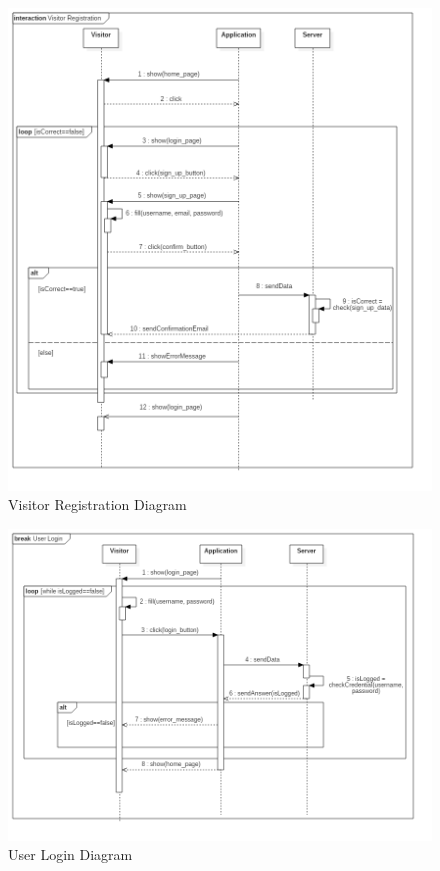\begin{figure}[!h]
\centering
\includegraphics[scale=0.6]{images/VisitorRegistrationDiagram}
\caption{Visitor Registration Diagram}
\label{ref:visitorregistrationdiagram}
\end{figure}

\clearpage
\begin{figure}[!h]
\centering
\includegraphics[scale=0.5]{images/UserLoginDiagram}
\caption{User Login Diagram}
\label{ref:userlogindiagram}
\end{figure}

